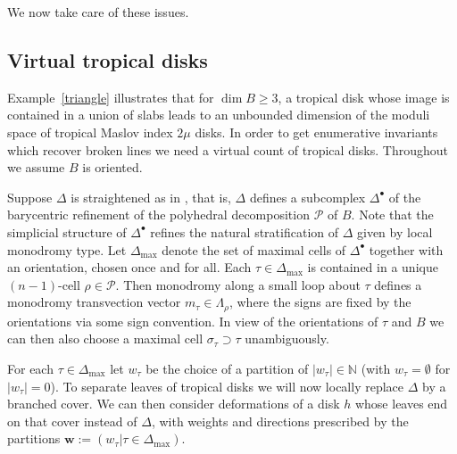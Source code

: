 \documentclass[11pt,letter]{amsart}
\theoremstyle{definition}
\theoremstyle{remark}
\numberwithin{equation}{section}
\numberwithin{figure}{section}
\renewcommand {\max} {{\operatorname{max}}}
\renewcommand{\P}  {\mathscr{P}}
\begin{document}
We now take care of these issues.


\subsection{Virtual tropical disks}
Example~\ref{triangle} illustrates that for $\dim B\geq 3$, a tropical disk
whose image is contained in a union of slabs leads to an unbounded dimension of
the moduli space of tropical Maslov index $2\mu$ disks. In order to get
enumerative invariants which recover broken lines we need a virtual count of
tropical disks. Throughout we assume $B$ is oriented.
\smallskip

Suppose $\Delta$ is straightened as in \cite[Rem.\,1.49]{logmirror}, that is,
$\Delta$ defines a subcomplex $\Delta^\bullet$ of the barycentric refinement of
the polyhedral decomposition $\P$ of $B$. Note that the simplicial structure of
$\Delta^\bullet$ refines the natural stratification of $\Delta$ given by local
monodromy type. Let $\Delta_\max$ denote the set of maximal cells of $\Delta
^\bullet$ together with an orientation, chosen once and for all. Each $\tau \in
\Delta_\max$ is contained in a unique $(n-1)$-cell $\rho\in\P$. Then monodromy
along a small loop about $\tau$ defines a monodromy transvection vector
$m_\tau\in\Lambda_\rho$, where the signs are fixed by the orientations via some
sign convention. In view of the orientations of $\tau$ and $B$ we can then also
choose a maximal cell $\sigma_\tau\supset \tau$ unambiguously.

For each $\tau \in \Delta_\max$ let $w_\tau$ be the choice of a partition of
$|w_\tau|\in \mathbb N$ (with $w_\tau = \emptyset$ for $|w_\tau|=0$). To
separate leaves of tropical disks we will now locally replace $\Delta$ by a
branched cover. We can then consider deformations of a disk $h$ whose leaves end
on that cover instead of $\Delta$, with weights and directions prescribed by the
partitions $\mathbf{w}:=(w_\tau|\tau \in \Delta_\max)$.
\medskip
\end{document}
